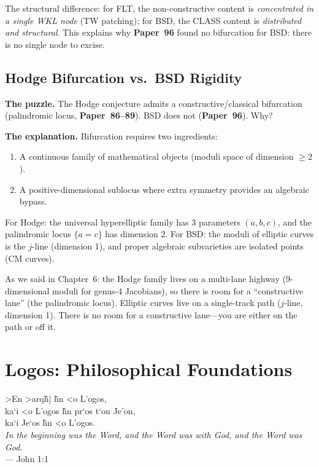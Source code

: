 \documentclass[11pt,twoside,openany]{report}
\theoremstyle{remark}
\newcommand{\WKL}{\textsf{WKL}}
\newcommand{\CLASS}{\textsf{CLASS}}
\newcommand{\paperref}[1]{\textbf{Paper~#1}}
\begin{document}
The structural difference: for FLT, the non-constructive content is \emph{concentrated in a single \WKL{} node} (TW patching); for BSD, the \CLASS{} content is \emph{distributed and structural}. This explains why \paperref{96} found no bifurcation for BSD: there is no single node to excise.


\section{Hodge Bifurcation vs.\ BSD Rigidity}

\textbf{The puzzle.} The Hodge conjecture admits a constructive/classical bifurcation (palindromic locus, \paperref{86--89}). BSD does not (\paperref{96}). Why?

\textbf{The explanation.} Bifurcation requires two ingredients:
\begin{enumerate}
  \item A continuous family of mathematical objects (moduli space of dimension $\geq 2$).
  \item A positive-dimensional sublocus where extra symmetry provides an algebraic bypass.
\end{enumerate}

For Hodge: the universal hyperelliptic family has 3 parameters $(a,b,c)$, and the palindromic locus $\{a = c\}$ has dimension 2. For BSD: the moduli of elliptic curves is the $j$-line (dimension 1), and proper algebraic subvarieties are isolated points (CM curves).

\begin{analogybox}
As we said in Chapter~6: the Hodge family lives on a multi-lane highway (9-dimensional moduli for genus-4 Jacobians), so there is room for a ``constructive lane'' (the palindromic locus). Elliptic curves live on a single-track path ($j$-line, dimension 1). There is no room for a constructive lane---you are either on the path or off it.
\end{analogybox}


\vfill
\chapter{Logos: Philosophical Foundations}\label{app:logos}

\begin{center}
\foreignlanguage{greek}{%
>En >arq\~h| \~hn <o L'ogos,\\[4pt]
ka`i <o L'ogos \~hn pr`os t`on Je'on,\\[4pt]
ka`i Je`os \~hn <o L'ogos.%
}\\[12pt]
\textit{In the beginning was the Word, and the Word was with God, and the Word was God.}\\[4pt]
--- John 1:1
\end{center}
\end{document}
